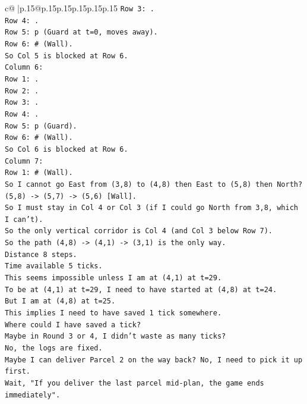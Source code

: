 \documentclass{article}
\begin{document}
{\begin{supertabular}{c@{$\;$}|p{.15\linewidth}@{}p{.15\linewidth}p{.15\linewidth}p{.15\linewidth}p{.15\linewidth}p{.15\linewidth}}
{{{\texttt{Row 3: .} \\
\texttt{Row 4: .} \\
\texttt{Row 5: p (Guard at t=0, moves away).} \\
\texttt{Row 6: \# (Wall).} \\
\texttt{So Col 5 is blocked at Row 6.} \\
\texttt{Column 6:} \\
\texttt{Row 1: .} \\
\texttt{Row 2: .} \\
\texttt{Row 3: .} \\
\texttt{Row 4: .} \\
\texttt{Row 5: p (Guard).} \\
\texttt{Row 6: \# (Wall).} \\
\texttt{So Col 6 is blocked at Row 6.} \\
\texttt{Column 7:} \\
\texttt{Row 1: \# (Wall).} \\
\texttt{So I cannot go East from (3,8) to (4,8) then East to (5,8) then North?} \\
\texttt{(5,8) {-}> (5,7) {-}> (5,6) {[}Wall{]}.} \\
\texttt{So I must stay in Col 4 or Col 3 (if I could go North from 3,8, which I can't).} \\
\texttt{So the only vertical corridor is Col 4 (and Col 3 below Row 7).} \\
\texttt{So the path (4,8) {-}> (4,1) {-}> (3,1) is the only way.} \\
\texttt{Distance 8 steps.} \\
\texttt{Time available 5 ticks.} \\
\texttt{This seems impossible unless I am at (4,1) at t=29.} \\
\texttt{To be at (4,1) at t=29, I need to have started at (4,8) at t=24.} \\
\texttt{But I am at (4,8) at t=25.} \\
\texttt{This implies I need to have saved 1 tick somewhere.} \\
\texttt{Where could I have saved a tick?} \\
\texttt{Maybe in Round 3 or 4, I didn't waste as many ticks?} \\
\texttt{No, the logs are fixed.} \\
\texttt{Maybe I can deliver Parcel 2 on the way back? No, I need to pick it up first.} \\
\texttt{Wait, "If you deliver the last parcel mid{-}plan, the game ends immediately".} \\
}}}
\end{supertabular}}
\end{document}
